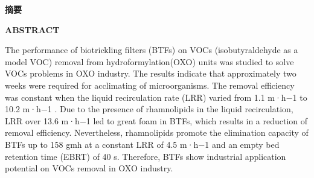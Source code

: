 \pagestyle{plain}       %

\begin{center}
    \erhao\song\textbf{摘要}
\end{center}

\song{}

\par
\vspace{1 ex}
\noindent
\song{}

\newpage

\begin{center}
    \erhao\textbf{ABSTRACT}
\end{center}

The performance of biotrickling filters (BTFs) on VOCs (isobutyraldehyde as a model VOC) removal
from hydroformylation(OXO) units was studied to solve VOCs problems in OXO industry. The results indicate
that approximately two weeks were required for acclimating of microorganisms. The removal efficiency was
constant when the liquid recirculation rate (LRR) varied from 1.1 m·h−1 to 10.2 m·h−1
. Due to the presence of rhamnolipids in the liquid recirculation, LRR over 13.6 m·h−1 led to great foam in BTFs, which results in a
reduction of removal efficiency. Nevertheless, rhamnolipids promote the elimination capacity of BTFs up to
158 gmh at a constant LRR of 4.5 m·h−1 and an empty bed retention time (EBRT) of 40 s. Therefore, BTFs
show industrial application potential on VOCs removal in OXO industry.

\par
\vspace{1 ex}
\noindent
{}


\newpage



